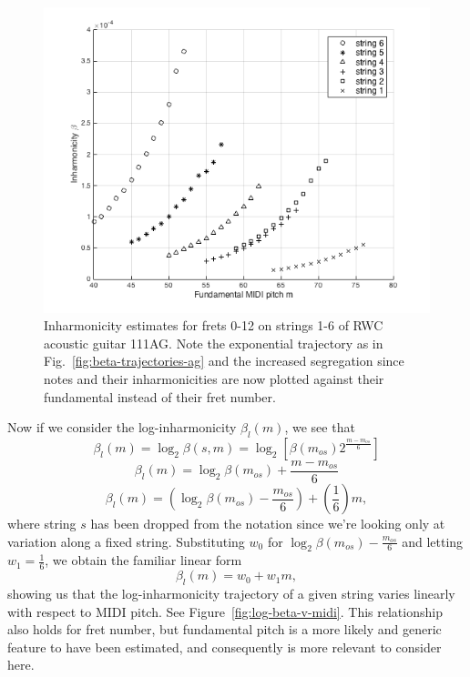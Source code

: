 \documentclass[12pt]{cmuthesis}
\begin{document}
\begin{figure}[h] 
\label{fig:beta-v-midi}
\centering
\includegraphics[scale=0.7]{beta-v-midi}
\caption{Inharmonicity estimates for frets 0-12 on strings 1-6 of RWC acoustic guitar 111AG. Note the exponential trajectory as in Fig.~\ref{fig:beta-trajectories-ag} and the increased segregation since notes and their inharmonicities are now plotted against their fundamental instead of their fret number.}
\end{figure}

Now if we consider the log-inharmonicity $\beta_{l}(m)$, we see that
\begin{equation}
\beta_l(m) = \log_2\beta(s,m) = \log_2[\beta(m_{os})2^{\frac{m-m_{os}}{6}}]
\end{equation}
\begin{equation}
\beta_l(m) = \log_2\beta(m_{os}) + \frac{m-m_{os}}{6}
\end{equation}
\begin{equation}
\beta_l(m) = (\log_2\beta(m_{os})-\frac{m_{os}}{6}) + (\frac{1}{6})m,
\end{equation}
where string $s$ has been dropped from the notation since we're looking only at variation along a fixed string. Substituting $w_0$ for $\log_2\beta(m_{os})-\frac{m_{os}}{6}$ and letting $w_1 = \frac{1}{6}$, we obtain the familiar linear form
\begin{equation}
\label{eq:linear-traj}
\beta_l(m) = w_0 + w_1m,
\end{equation}
showing us that the log-inharmonicity trajectory of a given string varies linearly with respect to MIDI pitch. See Figure~\ref{fig:log-beta-v-midi}. This relationship also holds for fret number, but fundamental pitch is a more likely and generic feature to have been estimated, and consequently is more relevant to consider here.
\end{document}
